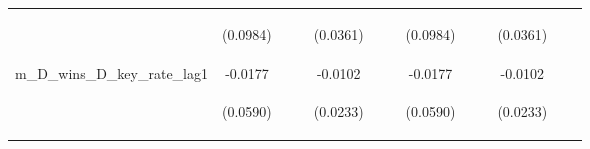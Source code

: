 \documentclass[]{article}
\begin{document}
\begin{center}
\begin{tabular}{lcccccccccccc}
\vspace{4pt} & \begin{footnotesize}(0.0984)\end{footnotesize} & \begin{footnotesize}\end{footnotesize} & \begin{footnotesize}\end{footnotesize} & \begin{footnotesize}(0.0361)\end{footnotesize} & \begin{footnotesize}\end{footnotesize} & \begin{footnotesize}\end{footnotesize} & \begin{footnotesize}(0.0984)\end{footnotesize} & \begin{footnotesize}\end{footnotesize} & \begin{footnotesize}\end{footnotesize} & \begin{footnotesize}(0.0361)\end{footnotesize} & \begin{footnotesize}\end{footnotesize} & \begin{footnotesize}\end{footnotesize} \\
m\_D\_wins\_D\_key\_rate\_lag1 & -0.0177 &  &  & -0.0102 &  &  & -0.0177 &  &  & -0.0102 &  &  \\
\vspace{4pt} & \begin{footnotesize}(0.0590)\end{footnotesize} & \begin{footnotesize}\end{footnotesize} & \begin{footnotesize}\end{footnotesize} & \begin{footnotesize}(0.0233)\end{footnotesize} & \begin{footnotesize}\end{footnotesize} & \begin{footnotesize}\end{footnotesize} & \begin{footnotesize}(0.0590)\end{footnotesize} & \begin{footnotesize}\end{footnotesize} & \begin{footnotesize}\end{footnotesize} & \begin{footnotesize}(0.0233)\end{footnotesize} & \begin{footnotesize}\end{footnotesize} & \begin{footnotesize}\end{footnotesize} \\

\end{tabular}
\end{center}
\end{document}
